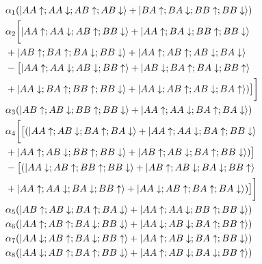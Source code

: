 \documentclass[aps,reprint,notitlepage,onecolumn,12pt]{revtex4-2}
\DeclarePairedDelimiter\ket{\lvert}{\rangle}%
\numberwithin{equation}{section}
\begin{document}
\begin{align}
    &\alpha_{1}(\ket{AA\uparrow;AA\downarrow;AB\uparrow;AB\downarrow}+\ket{BA\uparrow;BA\downarrow;BB\uparrow;BB\downarrow}) \nonumber \\
&\alpha_{2}\bigg[\ket{AA\uparrow;AA\downarrow;AB\uparrow;BB\downarrow}+\ket{AA\uparrow;BA\downarrow;BB\uparrow;BB\downarrow}\\
&+\ket{AB\uparrow;BA\uparrow;BA\downarrow;BB\downarrow}+\ket{AA\uparrow;AB\uparrow;AB\downarrow;BA\downarrow} \nonumber \\
&-\big[\ket{AA\uparrow;AA\downarrow;AB\downarrow;BB\uparrow}+\ket{AB\downarrow;BA\uparrow;BA\downarrow;BB\uparrow} \nonumber \\
&+\ket{AA\downarrow;BA\uparrow;BB\uparrow;BB\downarrow}+\ket{AA\downarrow;AB\uparrow;AB\downarrow;BA\uparrow})\big]\bigg] \nonumber \\
&\alpha_{3}(\ket{AB\uparrow;AB\downarrow;BB\uparrow;BB\downarrow}+\ket{AA\uparrow;AA\downarrow;BA\uparrow;BA\downarrow}) \nonumber \\
&\alpha_{4}\bigg[\big[(\ket{AA\uparrow;AB\downarrow;BA\uparrow;BA\downarrow}+\ket{AA\uparrow;AA\downarrow;BA\uparrow;BB\downarrow} \nonumber \\
&+\ket{AA\uparrow;AB\downarrow;BB\uparrow;BB\downarrow}+\ket{AB\uparrow;AB\downarrow;BA\uparrow;BB\downarrow})\big] \nonumber \\
&-\big[(\ket{AA\downarrow;AB\uparrow;BB\uparrow;BB\downarrow}+\ket{AB\uparrow;AB\downarrow;BA\downarrow;BB\uparrow} \nonumber \\&+\ket{AA\uparrow;AA\downarrow;BA\downarrow;BB\uparrow}+\ket{AA\downarrow;AB\uparrow;BA\uparrow;BA\downarrow})\big]\bigg] \\
&\alpha_{5}(\ket{AB\uparrow;AB\downarrow;BA\uparrow;BA\downarrow}+\ket{AA\uparrow;AA\downarrow;BB\uparrow;BB\downarrow}) \nonumber \\
&\alpha_{6}(\ket{AA\uparrow;AB\uparrow;BA\downarrow;BB\downarrow}+\ket{AA\downarrow;AB\downarrow;BA\uparrow;BB\uparrow}) \nonumber \\
&\alpha_{7}(\ket{AA\downarrow;AB\uparrow;BA\downarrow;BB\uparrow}+\ket{AA\uparrow;AB\downarrow;BA\uparrow;BB\downarrow}) \nonumber \\
&\alpha_{8}(\ket{AA\downarrow;AB\uparrow;BA\uparrow;BB\downarrow}+\ket{AA\uparrow;AB\downarrow;BA\downarrow;BB\uparrow}) \nonumber 
\end{align}
\end{document}
